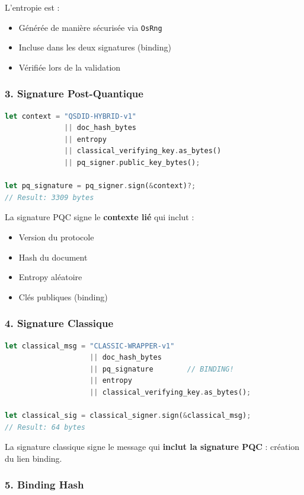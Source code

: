 \documentclass[12pt,a4paper]{report}
\begin{document}
L'entropie est : 
\begin{itemize}
  \item Générée de manière sécurisée via \texttt{OsRng}
  \item Incluse dans les deux signatures (binding)
  \item Vérifiée lors de la validation
\end{itemize}

\subsubsection{3. Signature Post-Quantique}

\begin{lstlisting}[language=Rust]
let context = "QSDID-HYBRID-v1" 
              || doc_hash_bytes 
              || entropy 
              || classical_verifying_key.as_bytes()
              || pq_signer.public_key_bytes();

let pq_signature = pq_signer.sign(&context)?;
// Result: 3309 bytes
\end{lstlisting}

La signature PQC signe le \textbf{contexte lié} qui inclut :
\begin{itemize}
  \item Version du protocole
  \item Hash du document
  \item Entropy aléatoire
  \item Clés publiques (binding)
\end{itemize}

\subsubsection{4. Signature Classique}

\begin{lstlisting}[language=Rust]
let classical_msg = "CLASSIC-WRAPPER-v1"
                    || doc_hash_bytes
                    || pq_signature        // BINDING!
                    || entropy
                    || classical_verifying_key.as_bytes();

let classical_sig = classical_signer.sign(&classical_msg);
// Result: 64 bytes
\end{lstlisting}

La signature classique signe le message qui \textbf{inclut la signature PQC} : création du lien binding.

\subsubsection{5. Binding Hash}
\end{document}
